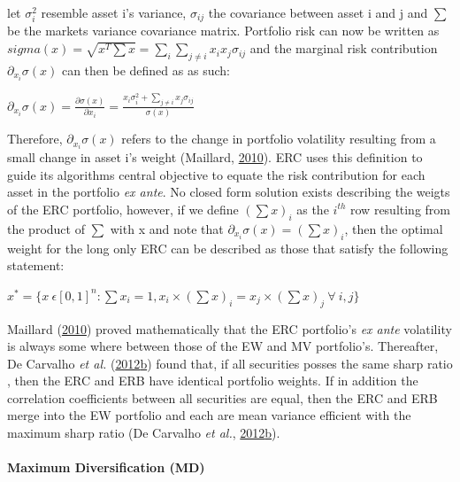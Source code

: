 \documentclass[11pt,preprint, authoryear]{elsarticle}
\numberwithin{equation}{section}
\numberwithin{figure}{section}
\numberwithin{table}{section}
\begin{document}
let \(\sigma_i^2\) resemble asset i's variance, \(\sigma_{ij}\) the
covariance between asset i and j and \(\sum\) be the markets variance
covariance matrix. Portfolio risk can now be written as
\(sigma(x)=\sqrt{x^T\sum x}=\sum_i\sum_{j\neq i}x_ix_j\sigma_{ij}\) and
the marginal risk contribution \(\partial_{x_i}\sigma(x)\) can then be
defined as as such:

\begin{center}
$\partial_{x_i}\sigma(x)=\frac{\partial\sigma(x)}{\partial x_i}=\frac{x_i\sigma_i^2+\sum_{j\neq i}x_j\sigma_{ij}}{\sigma(x)}$ 
\end{center}

Therefore, \(\partial_{x_i}\sigma(x)\) refers to the change in portfolio
volatility resulting from a small change in asset i's weight (Maillard,
\protect\hyperlink{ref-maillard2010}{2010}). ERC uses this definition to
guide its algorithms central objective to equate the risk contribution
for each asset in the portfolio \emph{ex ante}. No closed form solution
exists describing the weigts of the ERC portfolio, however, if we define
\((\sum x)_i\) as the \(i^{th}\) row resulting from the product of
\(\sum\) with x and note that \(\partial_{x_i}\sigma(x)=(\sum x)_i\),
then the optimal weight for the long only ERC can be described as those
that satisfy the following statement:

\begin{center}
$x^*=\{x \ \epsilon[0,1]^n:\sum x_i=1, x_i \times (\sum x)_i=x_j \times (\sum x)_j \ \forall  \ i,j \}$ 
\end{center}

Maillard (\protect\hyperlink{ref-maillard2010}{2010}) proved
mathematically that the ERC portfolio's \emph{ex ante} volatility is
always some where between those of the EW and MV portfolio's.
Thereafter, De Carvalho \emph{et al.}
(\protect\hyperlink{ref-leote}{2012}\protect\hyperlink{ref-leote}{b})
found that, if all securities posses the same sharp ratio , then the ERC
and ERB have identical portfolio weights. If in addition the correlation
coefficients between all securities are equal, then the ERC and ERB
merge into the EW portfolio and each are mean variance efficient with
the maximum sharp ratio (De Carvalho \emph{et al.},
\protect\hyperlink{ref-leote}{2012}\protect\hyperlink{ref-leote}{b}).

\hypertarget{maximum-diversification-md}{%
\paragraph{Maximum Diversification
(MD)}\label{maximum-diversification-md}}
\end{document}
